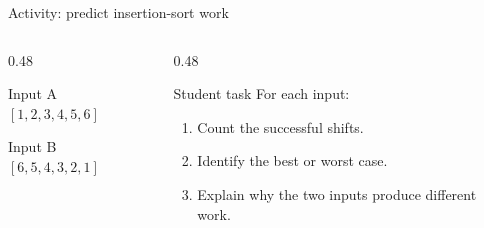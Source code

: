 \documentclass[aspectratio=169]{beamer}
\begin{document}
\begin{frame}{Activity: predict insertion-sort work}
  \begin{columns}[T]
    \begin{column}{0.48\textwidth}
      \begin{block}{Input A}
        $[1,2,3,4,5,6]$
      \end{block}
      \begin{exampleblock}{Input B}
        $[6,5,4,3,2,1]$
      \end{exampleblock}
    \end{column}
    \begin{column}{0.48\textwidth}
      \begin{alertblock}{Student task}
        For each input:
        \begin{enumerate}
          \item Count the successful shifts.
          \item Identify the best or worst case.
          \item Explain why the two inputs produce different work.
        \end{enumerate}
      \end{alertblock}
    \end{column}
  \end{columns}
\end{frame}
\end{document}
